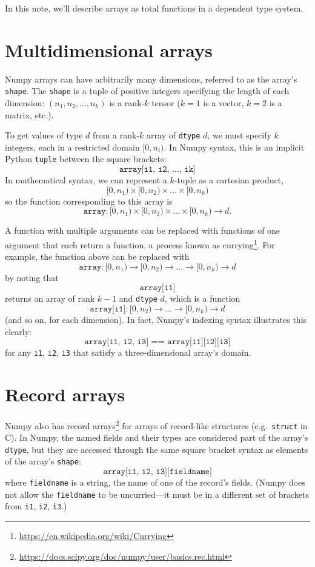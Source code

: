 \documentclass[12pt]{article}
\begin{document}
In this note, we'll describe arrays as total functions in a dependent type system.

\section*{Multidimensional arrays}

Numpy arrays can have arbitrarily many dimensions, referred to as the array's \texttt{shape}. The \texttt{shape} is a tuple of positive integers specifying the length of each dimension: $(n_1, n_2, \ldots, n_k)$ is a rank-$k$ tensor ($k = 1$ is a vector, $k = 2$ is a matrix, etc.).

To get values of type $d$ from a rank-$k$ array of \texttt{dtype} $d$, we must specify $k$ integers, each in a restricted domain $[0, n_i)$. In Numpy syntax, this is an implicit Python \texttt{tuple} between the square brackets:
\[ \texttt{array[i1, i2, ..., ik]} \]
\noindent In mathematical syntax, we can represent a $k$-tuple as a cartesian product,
\[ [0, n_1) \times [0, n_2) \times \ldots \times [0, n_k) \]
\noindent so the function corresponding to this array is
\[ \texttt{array}: [0, n_1) \times [0, n_2) \times \ldots \times [0, n_k) \to d. \]

A function with multiple arguments can be replaced with functions of one argument that each return a function, a process known as currying\footnote{\url{https://en.wikipedia.org/wiki/Currying}}. For example, the function above can be replaced with
\[ \texttt{array}: [0, n_1) \to [0, n_2) \to \ldots \to [0, n_k) \to d \]
\noindent by noting that
\[ \texttt{array[i1]} \]
\noindent returns an array of rank $k - 1$ and \texttt{dtype} $d$, which is a function
\[ \texttt{array[i1]}: [0, n_2) \to \ldots \to [0, n_k) \to d \]
\noindent (and so on, for each dimension). In fact, Numpy's indexing syntax illustrates this clearly:
\[ \texttt{array[i1, i2, i3] == array[i1][i2][i3]} \]
\noindent for any \texttt{i1}, \texttt{i2}, \texttt{i3} that satisfy a three-dimensional array's domain.

\section*{Record arrays}

Numpy also has record arrays\footnote{\url{https://docs.scipy.org/doc/numpy/user/basics.rec.html}} for arrays of record-like structures (e.g.\ \texttt{struct} in C). In Numpy, the named fields and their types are considered part of the array's \texttt{dtype}, but they are accessed through the same square bracket syntax as elements of the array's \texttt{shape}:
\[ \texttt{array[i1, i2, i3][fieldname]} \]
\noindent where \texttt{fieldname} is a string, the name of one of the record's fields. (Numpy does not allow the \texttt{fieldname} to be uncurried---it must be in a different set of brackets from \texttt{i1}, \texttt{i2}, \texttt{i3}.)
\end{document}
